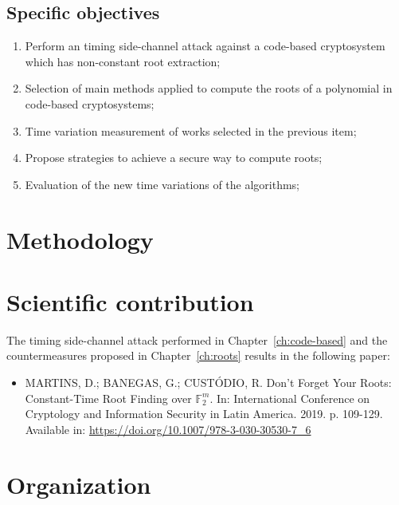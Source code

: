 \subsection{Specific objectives}
\begin{enumerate}[label=\roman*., itemsep=1pt]
    \item Perform an timing side-channel attack against a code-based cryptosystem which has non-constant root extraction;
    \item Selection of main methods applied to compute the roots of a polynomial in code-based cryptosystems;
    \item Time variation measurement of works selected in the previous item;
    \item Propose strategies to achieve a secure way to compute roots;
    \item Evaluation of the new time variations of the algorithms;
\end{enumerate}


\section{Methodology}
\section{Scientific contribution}
The timing side-channel attack performed in Chapter~\ref{ch:code-based} and the countermeasures proposed in Chapter~\ref{ch:roots} results in the following paper:

\begin{itemize}
    \item  MARTINS, D.; BANEGAS, G.; CUSTÓDIO, R. Don’t Forget Your Roots: Constant-Time Root Finding over $\mathbb{F}_2^m$. In: International Conference on Cryptology and Information Security in Latin America.  2019. p. 109-129. Available in: \url{https://doi.org/10.1007/978-3-030-30530-7\_6}
\end{itemize}
\section{Organization}














